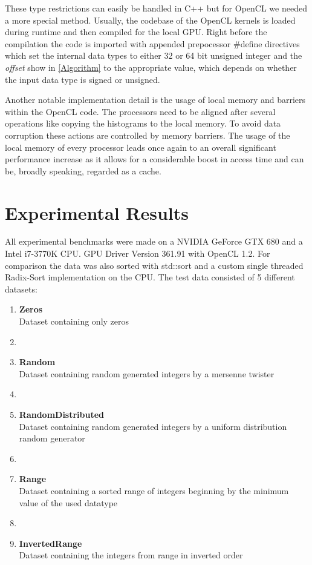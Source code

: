 \documentclass{llncs}
\begin{document}
These type restrictions can easily be handled in C++ but for OpenCL we needed a more special method. Usually, the codebase of the OpenCL kernels is loaded during runtime and then compiled for the local GPU. Right before the compilation the code is imported with appended prepocessor \#define directives which set the internal data types to either 32 or 64 bit unsigned integer and the \textit{offset} show in \ref{Algorithm} to the appropriate value, which depends on whether the input data type is signed or unsigned.

Another notable implementation detail is the usage of local memory and barriers within the OpenCL code. The processors need to be aligned after several operations like copying the histograms to the local memory. To avoid data corruption these actions are controlled by memory barriers. The usage of the local memory of every processor leads once again to an overall significant performance increase as it allows for a considerable boost in access time and can be, broadly speaking, regarded as a cache.

\newpage
\section{Experimental Results}
All experimental benchmarks were made on a NVIDIA GeForce GTX 680 and a Intel i7-3770K CPU. GPU Driver Version 361.91 with OpenCL 1.2. For comparison the data was also sorted with std::sort and a custom single threaded Radix-Sort implementation on the CPU. The test data consisted of 5 different datasets:

\begin{enumerate}
  \item \textbf{Zeros}\\ Dataset containing only zeros
  \item[]
  \item \textbf{Random}\\ Dataset containing random generated integers by a mersenne twister
  \item[]
  \item \textbf{RandomDistributed}\\  Dataset containing random generated integers by a uniform distribution random generator
  \item[]
  \item \textbf{Range}\\ Dataset containing a sorted range of integers beginning by the minimum value of the used datatype
  \item[]
  \item \textbf{InvertedRange}\\ Dataset containing the integers from range in inverted order
\end{enumerate}
\end{document}
